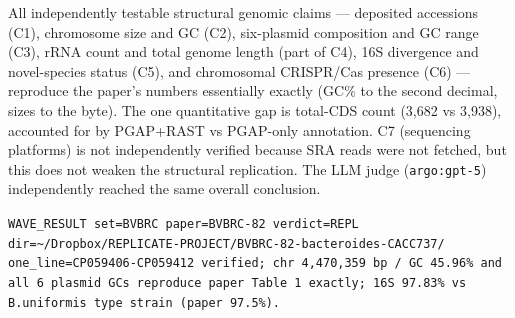 \documentclass[11pt,letterpaper]{article}
\begin{document}
All independently testable structural genomic claims --- deposited accessions (C1), chromosome size and GC (C2), six-plasmid composition and GC range (C3), rRNA count and total genome length (part of C4), 16S divergence and novel-species status (C5), and chromosomal CRISPR/Cas presence (C6) --- reproduce the paper's numbers essentially exactly (GC\% to the second decimal, sizes to the byte). The one quantitative gap is total-CDS count (3{,}682 vs 3{,}938), accounted for by PGAP+RAST vs PGAP-only annotation. C7 (sequencing platforms) is not independently verified because SRA reads were not fetched, but this does not weaken the structural replication. The LLM judge (\texttt{argo:gpt-5}) independently reached the same overall conclusion.

\medskip
\noindent\texttt{WAVE\_RESULT set=BVBRC paper=BVBRC-82 verdict=REPL dir=\textasciitilde/Dropbox/REPLICATE-PROJECT/BVBRC-82-bacteroides-CACC737/}\\
\texttt{one\_line=CP059406-CP059412 verified; chr 4,470,359 bp / GC 45.96\% and all 6 plasmid GCs reproduce paper Table 1 exactly; 16S 97.83\% vs B.uniformis type strain (paper 97.5\%).}
\end{document}

